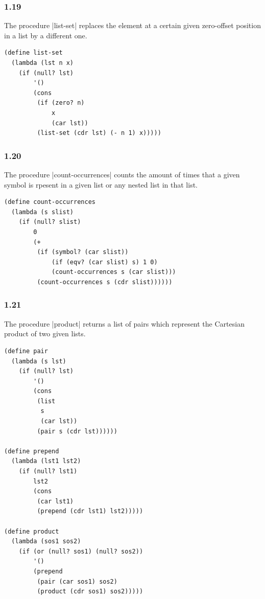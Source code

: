 \documentclass[a4paper]{article}
\begin{document}
\subsubsection*{1.19}

The procedure |list-set| replaces the element at a certain given zero-offset position in a list by a different one.

\begin{lstlisting}
(define list-set
  (lambda (lst n x)
    (if (null? lst)
        '()
        (cons
         (if (zero? n)
             x
             (car lst))
         (list-set (cdr lst) (- n 1) x)))))
\end{lstlisting}

\subsubsection*{1.20}

The procedure |count-occurrences| counts the amount of times that a given symbol is rpesent in a given list or any nested list in that list.

\begin{lstlisting}
(define count-occurrences
  (lambda (s slist)
    (if (null? slist)
        0
        (+
         (if (symbol? (car slist))
             (if (eqv? (car slist) s) 1 0)
             (count-occurrences s (car slist)))
         (count-occurrences s (cdr slist))))))
\end{lstlisting}

\subsubsection*{1.21}

The procedure |product| returns a list of pairs which represent the Cartesian product of two given lists.

\begin{lstlisting}
(define pair
  (lambda (s lst)
    (if (null? lst)
        '()
        (cons
         (list
          s
          (car lst))
         (pair s (cdr lst))))))

(define prepend
  (lambda (lst1 lst2)
    (if (null? lst1)
        lst2
        (cons
         (car lst1)
         (prepend (cdr lst1) lst2)))))

(define product
  (lambda (sos1 sos2)
    (if (or (null? sos1) (null? sos2))
        '()
        (prepend
         (pair (car sos1) sos2)
         (product (cdr sos1) sos2)))))
\end{lstlisting}
\end{document}
